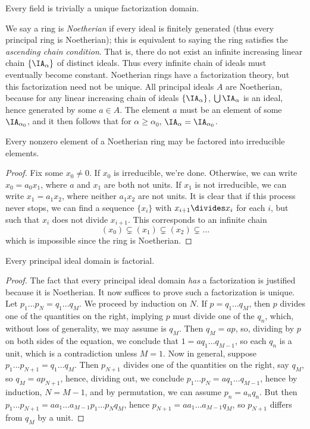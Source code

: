 \begin{example}
    Every field is trivially a unique factorization domain.
\end{example}

We say a ring is \emph{Noetherian} if every ideal is finitely generated (thus every principal ring is Noetherian); this is equivalent to saying the ring satisfies the {\it ascending chain condition}. That is, there do not exist an infinite increasing linear chain $\{ \IA_\alpha \}$ of distinct ideals. Thus every infinite chain of ideals must eventually become constant. Noetherian rings have a factorization theory, but this factorization need not be unique. All principal ideals $A$ are Noetherian, because for any linear increasing chain of ideals $\{ \IA_\alpha \}$, $\bigcup \IA_\alpha$ is an ideal, hence generated by some $a \in A$. The element $a$ must be an element of some $\IA_{\alpha_0}$, and it then follows that for $\alpha \geq \alpha_0$, $\IA_\alpha = \IA_{\alpha_0}$.

\begin{theorem}
    Every nonzero element of a Noetherian ring may be factored into irreducible elements.
\end{theorem}
\begin{proof}
    Fix some $x_0 \neq 0$. If $x_0$ is irreducible, we're done. Otherwise, we can write $x_0 = a_0x_1$, where $a$ and $x_1$ are both not units. If $x_1$ is not irreducible, we can write $x_1 = a_1x_2$, where neither $a_1x_2$ are not units. It is clear that if this process never stops, we can find a sequence $\{ x_i \}$ with $x_{i+1} \divides x_i$ for each $i$, but such that $x_i$ does not divide $x_{i+1}$. This corresponds to an infinite chain
    \[ (x_0) \subsetneq (x_1) \subsetneq (x_2) \subsetneq \dots \]
    which is impossible since the ring is Noetherian.
\end{proof}

\begin{theorem}
    Every principal ideal domain is factorial.
\end{theorem}
\begin{proof}
    The fact that every principal ideal domain {\it has} a factorization is justified because it is Noetherian. It now suffices to prove such a factorization is unique. Let $p_1 \dots p_N = q_1 \dots q_M$. We proceed by induction on $N$. If $p = q_1 \dots q_M$, then $p$ divides one of the quantities on the right, implying $p$ must divide one of the $q_n$, which, without loss of generality, we may assume is $q_M$. Then $q_M = ap$, so, dividing by $p$ on both sides of the equation, we conclude that $1 = a q_1 \dots q_{M-1}$, so each $q_n$ is a unit, which is a contradiction unless $M = 1$. Now in general, suppose $p_1 \dots p_{N+1} = q_1 \dots q_M$. Then $p_{N+1}$ divides one of the quantities on the right, say $q_M$, so $q_M = ap_{N+1}$, hence, dividing out, we conclude $p_1 \dots p_N = a q_1 \dots q_{M-1}$, hence by induction, $N = M-1$, and by permutation, we can assume $p_n = a_nq_n$. But then $p_1 \dots p_{N+1} = aa_1 \dots a_{M-1} p_1 \dots p_N q_M$, hence $p_{N+1} = aa_1 \dots a_{M-1} q_M$, so $p_{N+1}$ differs from $q_M$ by a unit.
\end{proof}

